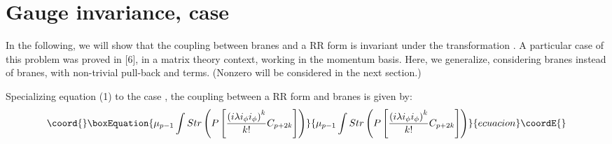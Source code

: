 \documentclass[a4paper,12pt]{article}
\begin{document}
\section{ Gauge invariance,  \coordHE{} case}
     In the following, we will show that the coupling between \coordHE{}  \coordHE{} branes and a \coordHE{} RR form is invariant under the transformation \coordHE{}. A particular case of this problem was proved in [6], in a matrix
 theory context, working in the momentum basis. Here, we generalize, considering \coordHE{} branes instead of \coordHE{} branes, with non-trivial pull-back and \coordHE{}  terms. (Nonzero \coordHE{} will be considered in the next section.)

Specializing equation (1) to the case \coordHE{}, the coupling between a \coordHE{} RR form and \coordHE{}  \coordHE{} branes is given by:
\begin{equation}\coord{}\boxEquation{
 \mu_{p-1}\int Str\left(P\left[\frac{\left(i\lambda i_\phi i_\phi \right)^k}{k!} C_{p+2k} \right]\right)
}{
 \mu_{p-1}\int Str\left(P\left[\frac{\left(i\lambda i_\phi i_\phi \right)^k}{k!} C_{p+2k} \right]\right)
}{ecuacion}\coordE{}\end{equation}
\end{document}
